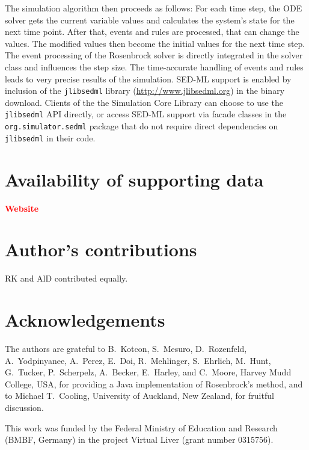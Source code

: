 \documentclass[10pt]{bmc_article}
\newenvironment{bmcformat}{\baselineskip20pt\sloppy\setboolean{publ}{false}}{\baselineskip20pt\sloppy}
\newcommand{\TODO}[1]{\textcolor{red}{\textbf{#1}}}
\newcommand{\jlibsedml}{\texttt{jlibsedml}}
\begin{document}
\begin{bmcformat}
The simulation algorithm then proceeds as follows: For each time step, the ODE
solver gets the current variable values and
calculates the system's state for the next time point. After that, events
and rules are processed, that can change the values. The modified values then
become the initial values for the next time step. The event processing of the
Rosenbrock solver
is directly integrated in the solver class and influences the
step size. The time-accurate handling of events and rules leads to very precise
results of the simulation.
%
SED-ML support is enabled by inclusion of the \jlibsedml{} library
(\href{http://www.jlibsedml.org}{http://www.jlibsedml.org}) in the binary
download. Clients of the the Simulation Core Library can choose to use the
\jlibsedml{} API directly, or access SED-ML support via  facade classes
in the \texttt{org.simulator.sedml} package that do not require direct
dependencies on \jlibsedml{} in their code.


\section{Availability of supporting data}

\TODO{Website}

\bigskip

\section*{Author's contributions}
   RK and AlD contributed equally.

    

\section*{Acknowledgements}
The authors are grateful to B.~Kotcon, S.~Mesuro, D.~Rozenfeld, A.~Yodpinyanee,
A.~Perez, E.~Doi, R.~Mehlinger, S.~Ehrlich, M.~Hunt, G.~Tucker, P.~Scherpelz,
A.~Becker, E.~Harley, and C.~Moore, Harvey Mudd College, USA, for providing a
Java implementation of Rosenbrock's method, and to Michael T.~Cooling,
University of Auckland, New Zealand, for fruitful discussion.

This work was funded by the Federal Ministry of Education and Research (BMBF,
Germany) in the project Virtual Liver (grant number 0315756).
 

\end{bmcformat}
\end{document}
